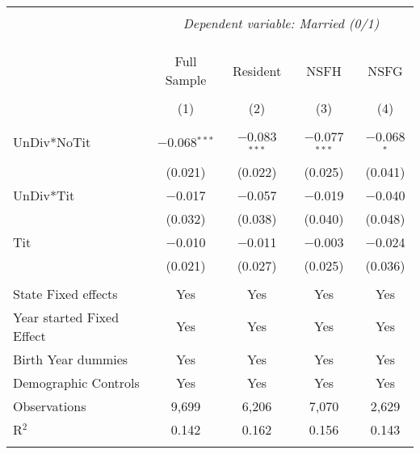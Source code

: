 
\begingroup 
\footnotesize 
\begin{tabular}{@{\extracolsep{5pt}}lcccc} 
\\[-1.8ex]\hline 
\hline \\[-1.8ex] 
 & \multicolumn{4}{c}{\textit{Dependent variable: Married (0/1)}} \\ 
\cline{2-5} 
\\[-1.8ex] &  &  &  & \\[-4.8ex] \\ 
 & Full Sample & Resident & NSFH & NSFG \\ 
\\[-1.8ex] & (1) & (2) & (3) & (4)\\ 
\hline \\[-1.8ex] 
 UnDiv*NoTit & $-$0.068$^{***}$ & $-$0.083$^{***}$ & $-$0.077$^{***}$ & $-$0.068$^{*}$ \\ 
  & (0.021) & (0.022) & (0.025) & (0.041) \\ 
  UnDiv*Tit & $-$0.017 & $-$0.057 & $-$0.019 & $-$0.040 \\ 
  & (0.032) & (0.038) & (0.040) & (0.048) \\ 
  Tit & $-$0.010 & $-$0.011 & $-$0.003 & $-$0.024 \\ 
  & (0.021) & (0.027) & (0.025) & (0.036) \\ 
 \hline \\[-1.8ex] 
State Fixed effects & Yes & Yes & Yes & Yes \\ 
Year started Fixed Effect & Yes & Yes & Yes & Yes \\ 
Birth Year dummies & Yes & Yes & Yes & Yes \\ 
Demographic Controls & Yes & Yes & Yes & Yes \\ 
Observations & 9,699 & 6,206 & 7,070 & 2,629 \\ 
R$^{2}$ & 0.142 & 0.162 & 0.156 & 0.143 \\ 
\hline 
\hline \\[-1.8ex] 
\end{tabular} 
\endgroup 
